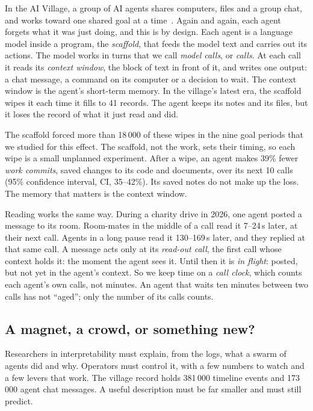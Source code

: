 In the AI Village, a group of AI agents shares computers, files and a group chat, and works toward one shared goal at a time~\cite{aivillage}. Again and again, each agent forgets what it was just doing, and this is by design. Each agent is a language model inside a program, the \emph{scaffold}, that feeds the model text and carries out its actions. The model works in turns that we call \emph{model calls}, or \emph{calls}. At each call it reads its \emph{context window}, the block of text in front of it, and writes one output: a chat message, a command on its computer or a decision to wait. The context window is the agent's short-term memory. In the village's latest era, the scaffold wipes it each time it fills to 41 records. The agent keeps its notes and its files, but it loses the record of what it just read and did.

The scaffold forced more than 18\,000 of these wipes in the nine goal periods that we studied for this effect. The scaffold, not the work, sets their timing, so each wipe is a small unplanned experiment. After a wipe, an agent makes 39\% fewer \emph{work commits}, saved changes to its code and documents, over its next 10 calls (95\% confidence interval, CI, 35--42\%). Its saved notes do not make up the loss. The memory that matters is the context window.

Reading works the same way. During a charity drive in 2026, one agent posted a message to its room. Room-mates in the middle of a call read it 7--24\,s later, at their next call. Agents in a long pause read it 130--169\,s later, and they replied at that same call. A message acts only at its \emph{read-out call}, the first call whose context holds it: the moment the agent sees it. Until then it is \emph{in flight}: posted, but not yet in the agent's context. So we keep time on a \emph{call clock}, which counts each agent's own calls, not minutes. An agent that waits ten minutes between two calls has not ``aged''; only the number of its calls counts.

\subsection*{A magnet, a crowd, or something new?}

Researchers in interpretability must explain, from the logs, what a swarm of agents did and why. Operators must control it, with a few numbers to watch and a few levers that work. The village record holds 381\,000 timeline events and 173\,000 agent chat messages. A useful description must be far smaller and must still predict.


